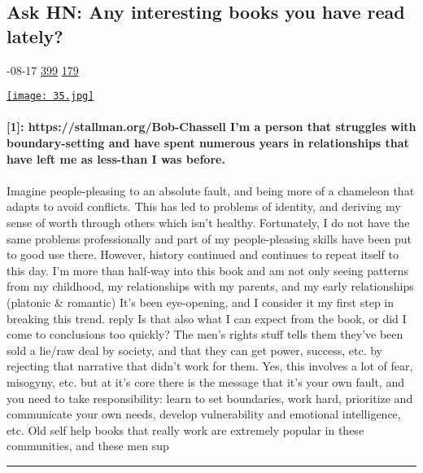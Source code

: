 \documentclass[10pt,a4paper]{article}
\begin{document}
\begin{multicols}{2}

\noindent\begin{minipage}{\linewidth}
\subsection{Ask HN: Any interesting books you have read lately?}
\textsc{\footnotesize
{\scriptsize\faCalendar}-08-17 
{\scriptsize\faThumbsOUp}\space 
\href{http://news.ycombinator.com/item?id=37133657\&utm\_term=comment}{399} 
{\scriptsize\faComments}\space 
\href{http://news.ycombinator.com/item?id=37133657\&utm\_term=comment}{179} 
}
\par\medskip\noindent
\href{https://news.ycombinator.com/item?id=37156372\&utm\_source=hackernewsletter\&utm\_medium=email\&utm\_term=books}{
    \texttt{[image: 35.jpg]}
}
\end{minipage}
\paragraph{}
\textbf{[1]: https://stallman.org/Bob-Chassell
I'm a person that struggles with boundary-setting and have spent numerous years in relationships that have left me as less-than I was before.}
\paragraph{}
 Imagine people-pleasing to an absolute fault, and being more of a chameleon that adapts to avoid conflicts. This has led to problems of identity, and deriving my sense of worth through others which isn't healthy.
Fortunately, I do not have the same problems professionally and part of my people-pleasing skills have been put to good use there.
However, history continued and continues to repeat itself to this day. I'm more than half-way into this book and am not only seeing patterns from my childhood, my relationships with my parents, and my early relationships (platonic \& romantic)
It's been eye-opening, and I consider it my first step in breaking this trend.
reply
Is that also what I can expect from the book, or did I come to conclusions too quickly?
The men's rights stuff tells them they've been sold a lie/raw deal by society, and that they can get power, success, etc. by rejecting that narrative that didn't work for them. Yes, this involves a lot of fear, misogyny, etc. but at it's core there is the message that it's your own fault, and you need to take responsibility: learn to set boundaries, work hard, prioritize and communicate your own needs, develop vulnerability and emotional intelligence, etc. Old self help books that really work are extremely popular in these communities, and these men sup
\par\noindent\textcolor{red}{\rule{\linewidth}{0.2mm}}
\vfill
\null
\noindent\begin{minipage}{\linewidth}

\end{minipage}
\end{multicols}
\end{document}
